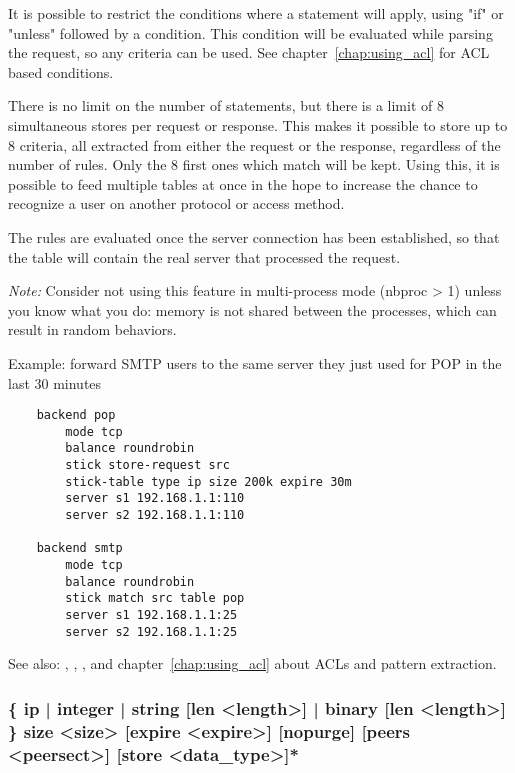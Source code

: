 {  It is possible to restrict the conditions where a 
  statement will apply, using "if" or "unless" followed by a condition. This
  condition will be evaluated while parsing the request, so any criteria can be
  used. See chapter~\ref{chap:using_acl} for ACL based conditions.

  There is no limit on the number of  statements, but
  there is a limit of 8 simultaneous stores per request or response. This
  makes it possible to store up to 8 criteria, all extracted from either the
  request or the response, regardless of the number of rules. Only the 8 first
  ones which match will be kept. Using this, it is possible to feed multiple
  tables at once in the hope to increase the chance to recognize a user on
  another protocol or access method.

  The  rules are evaluated once the server connection has been
  established, so that the table will contain the real server that processed
  the request.

  \emph{Note:} Consider not using this feature in multi-process mode (nbproc > 1)
         unless you know what you do: memory is not shared between the
         processes, which can result in random behaviors.

  Example: forward SMTP users to the same server they just used for POP in the last 30 minutes
  \begin{verbatim}
    backend pop
        mode tcp
        balance roundrobin
        stick store-request src
        stick-table type ip size 200k expire 30m
        server s1 192.168.1.1:110
        server s2 192.168.1.1:110

    backend smtp
        mode tcp
        balance roundrobin
        stick match src table pop
        server s1 192.168.1.1:25
        server s2 192.168.1.1:25
   \end{verbatim}

  See also: , , ,  and chapter~\ref{chap:using_acl}
             about ACLs and pattern extraction.

\subsubsection[stick-table type]{ \{ ip | integer | string [len <length>] | binary [len <length>] \} size <size> [expire <expire>] [nopurge] [peers <peersect>] [store <data\_type>]*}

}
